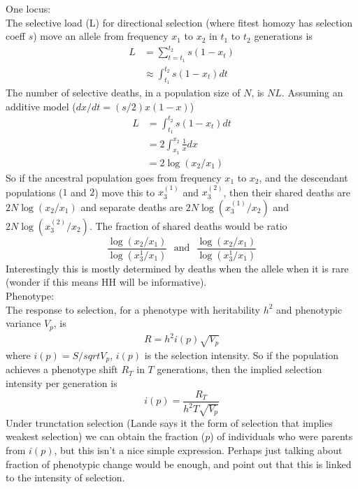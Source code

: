 \documentclass[a4paper,10pt]{article}
\begin{document}
One locus:\\
The selective load (L) for directional selection (where fitest homozy
has selection coeff $s$) move an allele from frequency $x_1$ to $x_2$
in $t_1$ to $t_2$ generations is
\begin{align}
L &= \sum_{t=t_1}^{t_2} s(1-x_t) \\
&\approx \int_{t_1}^{t_2}  s(1-x_t) dt
\end{align}
The number of selective deaths, in a population size of $N$, is
$NL$. Assuming an additive model ($dx/dt = (s/2)x(1-x)$) 
\begin{align}
L &= \int_{t_1}^{t_2}  s(1-x_t) dt\\
&= 2  \int_{x_1}^{x_2}  \frac{1}{x} dx\\
& = 2 \log(x_2/x_1) 
\end{align}
So if the ancestral population goes from frequency $x_1$ to $x_2$, and
the descendant populations ($1$ and $2$) move this to $x_3^{(1)}$ and
$x_3^{(2)}$, then their shared deaths are $2N\log(x_2/x_1)$ and separate
deaths are $2N\log(x_3^{(1)}/x_2)$ and
$2N\log(x_3^{(2)}/x_2)$. The fraction of shared deaths would be ratio
\begin{equation}
\frac{\log(x_2/x_1)}{\log(x_3^{1}/x_1)}~~~\textrm{and}~~~\frac{\log(x_2/x_1)}{\log(x_3^{1}/x_1)}
\end{equation}
Interestingly this is mostly determined by deaths when the
allele when it is rare (wonder if this means HH will be informative).\\

Phenotype:\\
The response to selection, for a phenotype with heritability $h^2$ and
phenotypic variance $V_p$, is 
\begin{align}
R = h^2 i(p) \sqrt{V_p}
\end{align}
where $i(p)=S/sqrt{V_p}$, $i(p)$ is the selection intensity. So if the
population achieves a phenotype shift $R_T$ in $T$ generations, then
the implied selection intensity per generation is 
\begin{equation}
i(p) = \frac{R_T}{h^2 T \sqrt{V_p}}
\end{equation}  
Under trunctation selection (Lande says it the form of selection that
implies weakest selection) we can obtain the fraction ($p$) of individuals
who were parents from $i(p)$, but this isn't a nice simple
expression. Perhaps just talking about fraction of phenotypic change would be
enough, and point out that this is linked to the intensity of
selection. 
\end{document}
